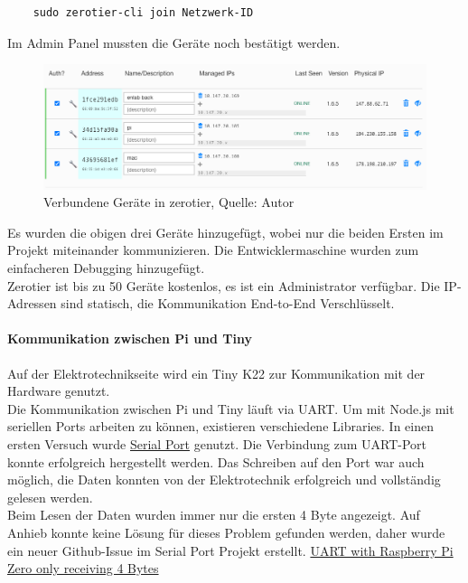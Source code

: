 \begin{verbatim}
	sudo zerotier-cli join Netzwerk-ID
\end{verbatim}
Im Admin Panel mussten die Geräte noch bestätigt werden.
\begin{figure}[H]
	\centering
	\includegraphics[width=1\textwidth]{images/zerotier.PNG}
	\caption[Verbundene Geräte in zerotier]{Verbundene Geräte in zerotier, Quelle: Autor}
	\label{img: zerotier}
\end{figure} 
Es wurden die obigen drei Geräte hinzugefügt, wobei nur die beiden Ersten im Projekt miteinander kommunizieren. Die Entwicklermaschine wurden zum einfacheren Debugging hinzugefügt. \\
Zerotier ist bis zu 50 Geräte kostenlos, es ist ein Administrator verfügbar. Die IP-Adressen sind statisch, die Kommunikation End-to-End Verschlüsselt.

\paragraph{Kommunikation zwischen Pi und Tiny}\label{kommTiny}
Auf der Elektrotechnikseite wird ein Tiny K22 zur Kommunikation mit der Hardware genutzt.\\
Die Kommunikation zwischen Pi und Tiny läuft via \ac{UART}. Um mit Node.js mit seriellen Ports arbeiten zu können, existieren verschiedene Libraries. In einen ersten Versuch wurde \href{https://serialport.io/}{Serial Port} genutzt. 
Die Verbindung zum \ac{UART}-Port konnte erfolgreich hergestellt werden. Das Schreiben auf den Port war auch möglich, die Daten konnten von der Elektrotechnik erfolgreich und vollständig gelesen werden. \\
Beim Lesen der Daten wurden immer nur die ersten 4 Byte angezeigt. Auf Anhieb konnte keine Lösung für dieses Problem gefunden werden, daher wurde ein neuer \gls{Github}-Issue im Serial Port Projekt erstellt. 
\href{https://github.com/serialport/node-serialport/issues/2252}{UART with Raspberry Pi Zero only receiving 4 Bytes}\\\\

